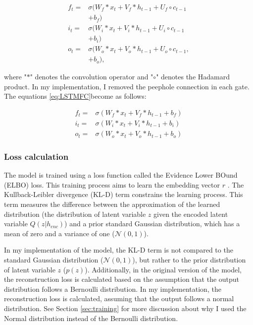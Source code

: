 \documentclass[11pt,a4paper]{article}
\begin{document}
\begin{equation}
\begin{aligned}
  f_t =& \sigma(W_f \ast x_t + V_f \ast h_{t-1} + U_f \circ c_{t - 1}\\ 
         & + b_f)\\
  i_t =& \sigma(W_i \ast x_t + V_i \ast h_{t-1} + U_i \circ c_{t - 1}\\ 
         &  + b_i)\\
  o_t =& \sigma(W_o \ast x_t + V_o \ast h_{t-1} + U_o \circ c_{t - 1},\\
         & + b_o),
\label{eq:LSTMFC}
\end{aligned}
\end{equation}

where "$\ast$" denotes the convolution operator and "$\circ$" denotes the Hadamard product. In my implementation, I removed the peephole connection in each gate. The equations \ref{eq:LSTMFC}become as follows:

\begin{equation}
\begin{aligned}
  f_t =& \sigma(W_f \ast x_t + V_f \ast h_{t-1} + b_f)\\
  i_t =& \sigma(W_i \ast x_t + V_i \ast h_{t-1} + b_i)\\
  o_t =& \sigma(W_o \ast x_t + V_o \ast h_{t-1} + b_o)
\label{eq:LSTM}
\end{aligned}
\end{equation}

\subsubsection{Loss calculation} \label{sec:losscalc}

The model is trained using a loss function called the Evidence Lower BOund (ELBO) loss. This training process aims to learn the embedding vector $r$ \cite{2013arXiv1312.6114K}. The Kullback-Leibler divergence (KL-D) term constrains the learning process. This term measures the difference between the approximation of the learned distribution (the distribution of latent variable $z$ given the encoded latent variable $Q(z|h_{enc})$) and a prior standard Gaussian distribution, which has a mean of zero and a variance of one ($\mathcal{N}(0,1)$).

In my implementation of the model, the KL-D term is not compared to the standard Gaussian distribution ($\mathcal{N}(0,1)$), but rather to the prior distribution of latent variable $z$ ($p(z)$). Additionally, in the original version of the model, the reconstruction loss is calculated based on the assumption that the output distribution follows a Bernoulli distribution. In my implementation, the reconstruction loss is calculated, assuming that the output follows a normal distribution. See Section \ref{sec:training} for more discussion about why I used the Normal distribution instead of the Bernoulli distribution.
\end{document}
